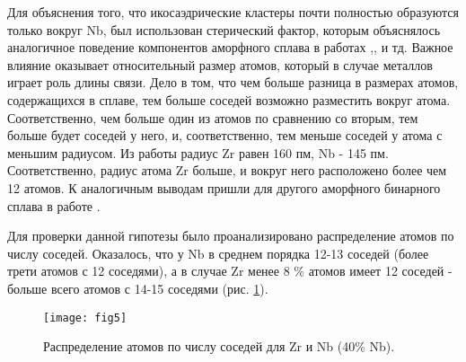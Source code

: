 Для объяснения того, что икосаэдрические кластеры почти полностью образуются только вокруг Nb, был использован стерический фактор, которым объяснялось аналогичное поведение компонентов аморфного сплава в работах  \cite{Sheng},\cite{Fukunaga}, \cite{Pryadilschikov} и тд.  Важное влияние оказывает относительный размер атомов, который в случае металлов играет роль длины связи. Дело в том, что чем больше разница в размерах атомов, содержащихся в сплаве, тем больше соседей возможно разместить вокруг атома. Соответственно, чем больше один из атомов по сравнению со вторым, тем больше будет соседей у него, и, соответственно, тем меньше соседей  у атома с меньшим радиусом. Из работы \cite{Tretyakov}  радиус Zr равен 160 пм, Nb - 145 пм. Соответственно,  радиус атома Zr больше, и вокруг него расположено более чем 12 атомов. К аналогичным выводам пришли для другого аморфного бинарного сплава в работе \cite{Bondarev}.

Для проверки данной гипотезы было проанализировано распределение атомов по числу соседей. Оказалось, что у Nb в среднем порядка 12-13 соседей (более трети атомов с 12 соседями), а в случае Zr менее 8 \% атомов имеет 12 соседей - больше всего атомов с 14-15 соседями (рис. \ref{chislo_sosedey}). 
\begin{figure}[h!]
	\begin{center}
		\texttt{[image: fig5]}{}{}{}
		\caption{Распределение атомов по числу соседей  для Zr и Nb (40\% Nb).}
		\label{chislo_sosedey}
	\end{center}
\end{figure}


